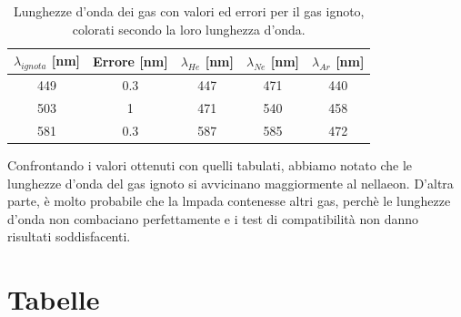 \documentclass[letterpaper,12pt]{article}
\begin{document}
\begin{table}[h!]
    \centering
    \begin{tabular}{|c|c|c|c|c|}
    \hline
    \textbf{$\lambda_{ignota}$} [nm] & \textbf{Errore} [nm] & \textbf{$\lambda_{He}$} [nm] & \textbf{$\lambda_{Ne}$} [nm] & \textbf{$\lambda_{Ar}$} [nm]\\
    \hline
    \cellcolor{wavelength_449} 449 & \cellcolor{wavelength_nan}0.3 & \cellcolor{wavelength_447} 447 & \cellcolor{wavelength_471} 471 & \cellcolor{wavelength_440} 440 \\
    \hline
    \cellcolor{wavelength_503} 503 & \cellcolor{wavelength_nan}1 & \cellcolor{wavelength_471} 471 & \cellcolor{wavelength_540} 540 & \cellcolor{wavelength_458} 458 \\
    \hline
    \cellcolor{wavelength_581} 581 & \cellcolor{wavelength_nan}0.3 & \cellcolor{wavelength_587} 587 & \cellcolor{wavelength_585} 585 & \cellcolor{wavelength_472} 472 \\
    \hline
    \end{tabular}
    \caption{Lunghezze d'onda dei gas con valori ed errori per il gas ignoto, colorati secondo la loro lunghezza d'onda.}
    \label{tab:reticolo_ignoto}
\end{table}

Confrontando i valori ottenuti con quelli tabulati, abbiamo notato che le lunghezze d'onda del gas ignoto si avvicinano
maggiormente al nellaeon. D'altra parte, è molto probabile che la lmpada contenesse altri gas, perchè le lunghezze d'onda
non combaciano perfettamente e i test di compatibilità non danno risultati soddisfacenti. \\ 

\newpage
\section{Tabelle}
\end{document}
